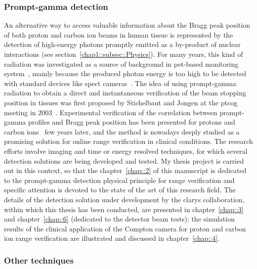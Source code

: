 \subsubsection{Prompt-gamma detection}\label{chap1::subsec::PGgeneral}
An alternative way to access valuable information about the Bragg peak position of both proton and carbon ion beams in human tissue is represented by the detection of high-energy photons promptly emitted as a by-product of nuclear interactions (see section~\ref{chap1::subsec::Physics}). For many years, this kind of radiation was investigated as a source of background in \gls{pet}-based monitoring system~\parencite{Parodi2005}, mainly because the produced photon energy is too high to be detected with standard devices like \gls{spect} cameras~\parencite{Kraan2015b}. The idea of using prompt-gamma radiation to obtain a direct and instantaneous verification of the beam stopping position in tissues was first proposed by Stichelbaut and Jongen at the  \gls{ptcog} meeting in 2003~\parencite{Stichelbaut2003}. Experimental verification of the correlation between prompt-gamma profiles and Bragg peak position has been presented for protons and carbon ions~\parencite{Min2006, Testa2008} few years later, and the method is nowadays deeply studied as a promising solution for online range verification in clinical conditions. The research efforts involve imaging and time or energy resolved techniques, for which several detection solutions are being developed and tested. 
My thesis project is carried out in this context, so that the chapter~\ref{chap::2} of this manuscript is dedicated to the prompt-gamma detection physical principle for range verification and specific attention is devoted to the state of the art of this research field. The details of the detection solution under development by the \gls{clarys} collaboration, within which this thesis has been conducted, are presented in chapter~\ref{chap::3} and chapter~\ref{chap::6} (dedicated to the detector beam tests); the simulation results of the clinical application of the Compton camera for proton and carbon ion range verification are illustrated and discussed in chapter~\ref{chap::4}.   

\subsubsection{Other techniques}\label{chap1::subsec::rangeComplTechniques}


